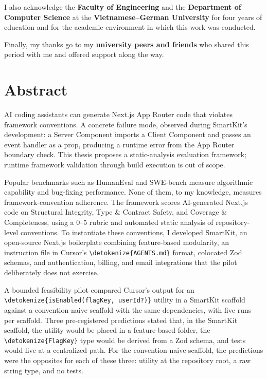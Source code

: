 \documentclass[12pt,a4paper]{report}
\newcommand{\code}[1]{\texttt{\nolinkurl{\detokenize{#1}}}}
\begin{document}
I also acknowledge the \textbf{Faculty of Engineering} and the \textbf{Department of Computer Science} at the \textbf{Vietnamese--German University} for four years of education and for the academic environment in which this work was conducted.

Finally, my thanks go to my \textbf{university peers and friends} who shared this period with me and offered support along the way.

\clearpage

\chapter*{Abstract}

AI coding assistants can generate Next.js App Router code that violates framework conventions. A concrete failure mode, observed during SmartKit's development: a Server Component imports a Client Component and passes an event handler as a prop, producing a runtime error from the App Router boundary check. This thesis proposes a static-analysis evaluation framework; runtime framework validation through build execution is out of scope.

Popular benchmarks such as HumanEval and SWE-bench measure algorithmic capability and bug-fixing performance. None of them, to my knowledge, measures framework-convention adherence. The framework scores AI-generated Next.js code on Structural Integrity, Type \& Contract Safety, and Coverage \& Completeness, using a 0--5 rubric and automated static analysis of repository-level conventions. To instantiate these conventions, I developed SmartKit, an open-source Next.js boilerplate combining feature-based modularity, an instruction file in Cursor's \code{AGENTS.md} format, colocated Zod schemas, and authentication, billing, and email integrations that the pilot deliberately does not exercise.

A bounded feasibility pilot compared Cursor's output for an \code{isEnabled(flagKey, userId?)} utility in a SmartKit scaffold against a convention-naive scaffold with the same dependencies, with five runs per scaffold. Three pre-registered predictions stated that, in the SmartKit scaffold, the utility would be placed in a feature-based folder, the \code{FlagKey} type would be derived from a Zod schema, and tests would live at a centralized path. For the convention-naive scaffold, the predictions were the opposites for each of these three: utility at the repository root, a raw string type, and no tests.
\end{document}
